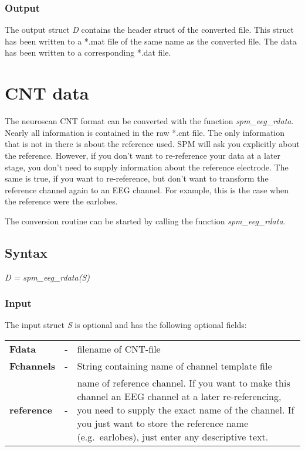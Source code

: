 \subsubsection{Output}
The output struct {\it D} contains the header struct of the converted
file. This struct has been written to a *.mat file of the same name as
the converted file. The data has been written to a corresponding *.dat
file.

\section{CNT data}
The neuroscan CNT format can be converted with the function {\it
spm\_eeg\_rdata}. Nearly
all information is contained in the raw *.cnt file. The only
information that is not in there is about the reference used. SPM will
ask you explicitly about the reference. However, if you
don't want to re-reference your data at a later stage, you don't need
to supply information about the reference electrode. The same is true,
if you want to re-reference, but don't want to transform the reference
channel again to an EEG channel. For example, this is the case when
the reference were the earlobes.

The conversion routine can be started by calling the function
\textit{spm\_eeg\_rdata}.

\subsection{Syntax}
\textit{D = spm\_eeg\_rdata(S)}
\\

\subsubsection{Input}
The input struct {\it S} is optional and has the following optional fields:

\begin{tabular}{lcp{9cm}}
{\bf Fdata} & - & filename of CNT-file\\
{\bf Fchannels} & - & String containing name of channel template file\\
{\bf reference} & - & name of reference channel. If you want to make this
channel an EEG channel at a later re-referencing, you need to supply
the exact name of the channel. If you just want to store the reference
name (e.g.~earlobes), just enter any descriptive text.
\end{tabular}

